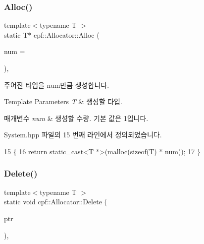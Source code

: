 \subsubsection{\texorpdfstring{Alloc()}{Alloc()}}
{\footnotesize\ttfamily template$<$typename T $>$ \\
static T$\ast$ cpf\+::\+Allocator\+::\+Alloc (\begin{DoxyParamCaption}\item[{uint32\+\_\+t}]{num = {} }\end{DoxyParamCaption})\hspace{0.3cm}{\ttfamily [inline]}, {\ttfamily [static]}}

주어진 타입을 num만큼 생성합니다. 
\begin{DoxyTemplParams}{Template Parameters}
{\em T} & 생성할 타입. \\
\hline
\end{DoxyTemplParams}

\begin{DoxyParams}{매개변수}
{\em num} & 생성할 수량. 기본 값은 1입니다. \\
\hline
\end{DoxyParams}


System.\+hpp 파일의 15 번째 라인에서 정의되었습니다.


\begin{DoxyCode}
15                                           \{
16             \textcolor{keywordflow}{return} \textcolor{keyword}{static\_cast<}T *\textcolor{keyword}{>}(malloc(\textcolor{keyword}{sizeof}(T) * num));
17         \}
\end{DoxyCode}
\mbox{\label{classcpf_1_1_allocator_a6c7808c532c47dc997deaf296aae4f27}} 
\subsubsection{\texorpdfstring{Delete()}{Delete()}}
{\footnotesize\ttfamily template$<$typename T $>$ \\
static void cpf\+::\+Allocator\+::\+Delete (\begin{DoxyParamCaption}\item[{T $\ast$}]{ptr }\end{DoxyParamCaption})\hspace{0.3cm}{\ttfamily [inline]}, {\ttfamily [static]}}


